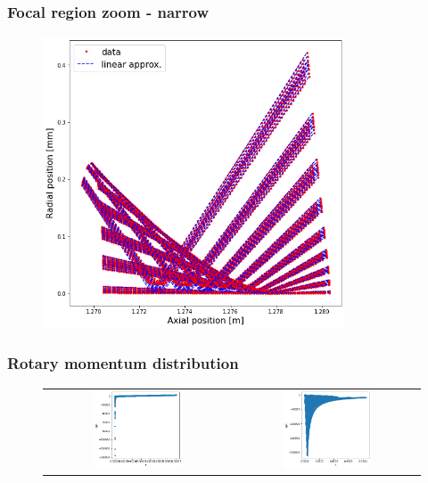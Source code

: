 \documentclass{beamer}
\begin{document}
\begin{frame}
  \frametitle{Focal region zoom - narrow}
  \begin{figure}
    \includegraphics[width=0.8\textwidth]{focus_zoom_narrow}
  \end{figure}
\end{frame}

\begin{frame}
  \frametitle{Rotary momentum distribution}
  \begin{figure}
    \begin{tabular}{cc}
      \includegraphics[width=0.5\textwidth]{r_pphi_wide} &
      \includegraphics[width=0.5\textwidth]{r_pphi_narrow}
    \end{tabular}
  \end{figure}
\end{frame}
\end{document}
